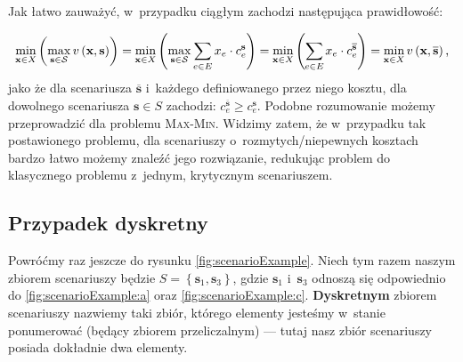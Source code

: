 Jak łatwo zauważyć, w~przypadku ciągłym zachodzi następująca prawidłowość:

\begin{equation}
		\min_{ \mathclap{\textbf{x} \in X}} \left( \max_{ \mathclap{\textbf{s} \in \mathcal{S}}} v \left( \textbf{x}, \textbf{s} \right) \right) = \min_{ \mathclap{\textbf{x} \in X}} \left( \max_{ \mathclap{\textbf{s} \in \mathcal{S}}} \sum_{e \in E} x_{e} \cdot c^{\textbf{s}}_{e} \right) = \min_{ \mathclap{\textbf{x} \in X}} \left( \sum_{ \mathclap{e \in E}} x_{e} \cdot c^{\overline{\textbf{s}}}_{e} \right) = \min_{ \mathclap{\textbf{x} \in X}} v \left( \textbf{x}, \overline{\textbf{s}} \right) \text{,}
\end{equation}
jako że dla scenariusza $\overline{\textbf{s}}$ i~każdego definiowanego przez niego kosztu, dla dowolnego scenariusza $\textbf{s} \in S$ zachodzi: $c^{\overline{\textbf{s}}}_{e} \geqslant c^{\textbf{s}}_{e}$.
Podobne rozumowanie możemy przeprowadzić dla problemu \textsc{Max-Min}.
Widzimy zatem, że w~przypadku tak postawionego problemu, dla scenariuszy o~rozmytych/niepewnych kosztach bardzo łatwo możemy znaleźć jego rozwiązanie, redukując problem do klasycznego problemu z~jednym, krytycznym scenariuszem.



\subsection{Przypadek dyskretny}



Powróćmy raz jeszcze do rysunku \ref{fig:scenarioExample}.
Niech tym razem naszym zbiorem scenariuszy będzie $S = \left\{ \textbf{s}_{1}, \textbf{s}_{3} \right\}$, gdzie $\textbf{s}_{1}$ i~$\textbf{s}_{3}$ odnoszą się odpowiednio do \ref{fig:scenarioExample:a} oraz \ref{fig:scenarioExample:c}.
\textbf{Dyskretnym} zbiorem scenariuszy nazwiemy taki zbiór, którego elementy jesteśmy w~stanie ponumerować (będący zbiorem przeliczalnym) --- tutaj nasz zbiór scenariuszy posiada dokładnie dwa elementy.

